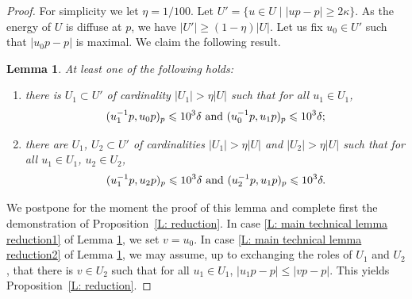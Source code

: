 \documentclass[11pt]{article}
\theoremstyle{plain}
\newtheorem{lem}[thm]{Lemma}
\theoremstyle{definition}
\begin{document}
\begin{proof}
For simplicity we let $\eta = 1/100$.
Let $U'=\{u\in U\mid |up-p|\geqslant 2\kappa\}$.
As the energy of $U$ is diffuse at $p$, we have $|U'|\geq (1-\eta) |U|$.
Let us fix $u_0\in U'$ such that $|u_0p-p|$ is maximal.
We claim the following result.

\begin{lem}\label{L: main technical lemma reduction}
At least one of the following holds:
\begin{enumerate}
\item\label{L: main technical lemma reduction1} there is $U_1\subset U'$ of cardinality $|U_1|>\eta |U|$ such that for all $u_1\in U_1$,
\[
(u_1^{-1}p,u_0p)_p\leqslant 10^3 \delta \hbox{ and } (u_0^{-1}p,u_1p)_p\leqslant 10^3 \delta;
\]
\item\label{L: main technical lemma reduction2} there are $U_1$, $U_2 \subset U'$ of cardinalities $|U_1|>\eta |U|$ and $|U_2|>\eta |U|$ such that for all $u_1\in U_1$, $u_2\in U_2$,
\[
(u_1^{-1}p,u_2p)_p\leqslant 10^3 \delta \hbox{ and } (u_2^{-1}p,u_1p)_p\leqslant 10^3 \delta.
\]
\end{enumerate}

\end{lem}

We postpone for the moment the proof of this lemma and complete first the demonstration of Proposition~\ref{L: reduction}.
In case \eqref{L: main technical lemma reduction1} of Lemma \ref{L: main technical lemma reduction}, we set $v=u_0$. In case \eqref{L: main technical lemma reduction2} of Lemma \ref{L: main technical lemma reduction}, we may assume, up to exchanging the roles of $U_1$ and $U_2$, that there is $v\in U_2$ such that for all $u_1\in U_1$, $|u_1p-p|\leqslant |vp-p|$. This yields Proposition~\ref{L: reduction}.
\end{proof}
\end{document}
